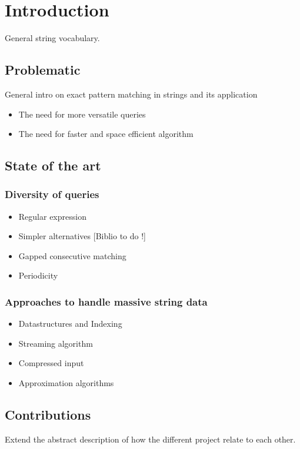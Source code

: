 \chapter*{Introduction}

General string vocabulary.

\section{Problematic}
General intro on exact pattern matching in strings and its application
\begin{itemize}
\item The need for more versatile queries
\item The need for faster and space efficient algorithm
\end{itemize}

\section{State of the art}

\subsection{Diversity of queries}
\begin{itemize}
\item Regular expression
\item Simpler alternatives [Biblio to do !]
\item Gapped consecutive matching
\item Periodicity
\end{itemize}

\subsection{Approaches to handle massive string data}

\begin{itemize}
\item Datastructures and Indexing
\item Streaming algorithm
\item Compressed input
\item Approximation algorithms
\end{itemize}

\section{Contributions}

Extend the abstract description of how the different project relate to each other.
